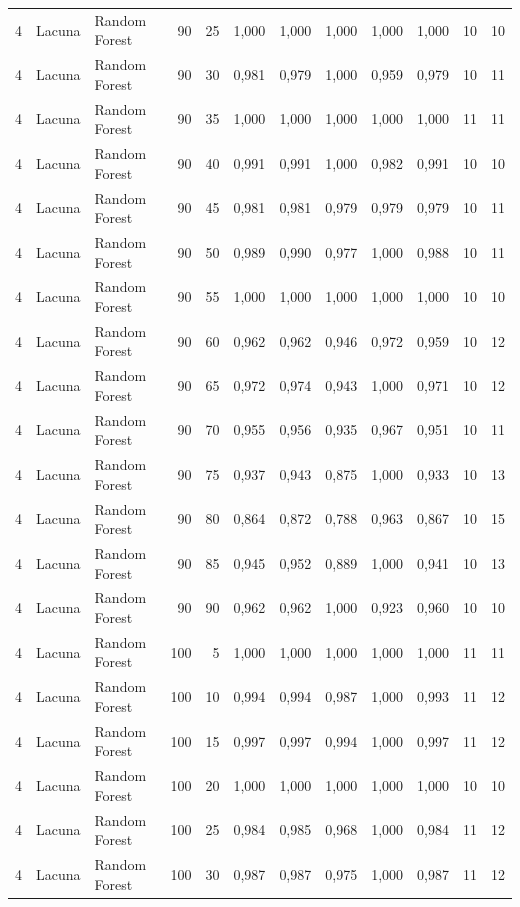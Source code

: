 \begin{longtable}{@{}rllrrrrrrrrr@{}}
4 & Lacuna & Random Forest & 90 & 25 & 1,000 & 1,000 & 1,000 & 1,000 & 1,000 & 10 & 10 \\
4 & Lacuna & Random Forest & 90 & 30 & 0,981 & 0,979 & 1,000 & 0,959 & 0,979 & 10 & 11 \\
4 & Lacuna & Random Forest & 90 & 35 & 1,000 & 1,000 & 1,000 & 1,000 & 1,000 & 11 & 11 \\
4 & Lacuna & Random Forest & 90 & 40 & 0,991 & 0,991 & 1,000 & 0,982 & 0,991 & 10 & 10 \\
4 & Lacuna & Random Forest & 90 & 45 & 0,981 & 0,981 & 0,979 & 0,979 & 0,979 & 10 & 11 \\
4 & Lacuna & Random Forest & 90 & 50 & 0,989 & 0,990 & 0,977 & 1,000 & 0,988 & 10 & 11 \\
4 & Lacuna & Random Forest & 90 & 55 & 1,000 & 1,000 & 1,000 & 1,000 & 1,000 & 10 & 10 \\
4 & Lacuna & Random Forest & 90 & 60 & 0,962 & 0,962 & 0,946 & 0,972 & 0,959 & 10 & 12 \\
4 & Lacuna & Random Forest & 90 & 65 & 0,972 & 0,974 & 0,943 & 1,000 & 0,971 & 10 & 12 \\
4 & Lacuna & Random Forest & 90 & 70 & 0,955 & 0,956 & 0,935 & 0,967 & 0,951 & 10 & 11 \\
4 & Lacuna & Random Forest & 90 & 75 & 0,937 & 0,943 & 0,875 & 1,000 & 0,933 & 10 & 13 \\
4 & Lacuna & Random Forest & 90 & 80 & 0,864 & 0,872 & 0,788 & 0,963 & 0,867 & 10 & 15 \\
4 & Lacuna & Random Forest & 90 & 85 & 0,945 & 0,952 & 0,889 & 1,000 & 0,941 & 10 & 13 \\
4 & Lacuna & Random Forest & 90 & 90 & 0,962 & 0,962 & 1,000 & 0,923 & 0,960 & 10 & 10 \\
4 & Lacuna & Random Forest & 100 & 5 & 1,000 & 1,000 & 1,000 & 1,000 & 1,000 & 11 & 11 \\
4 & Lacuna & Random Forest & 100 & 10 & 0,994 & 0,994 & 0,987 & 1,000 & 0,993 & 11 & 12 \\
4 & Lacuna & Random Forest & 100 & 15 & 0,997 & 0,997 & 0,994 & 1,000 & 0,997 & 11 & 12 \\
4 & Lacuna & Random Forest & 100 & 20 & 1,000 & 1,000 & 1,000 & 1,000 & 1,000 & 10 & 10 \\
4 & Lacuna & Random Forest & 100 & 25 & 0,984 & 0,985 & 0,968 & 1,000 & 0,984 & 11 & 12 \\
4 & Lacuna & Random Forest & 100 & 30 & 0,987 & 0,987 & 0,975 & 1,000 & 0,987 & 11 & 12 \\

\end{longtable}
